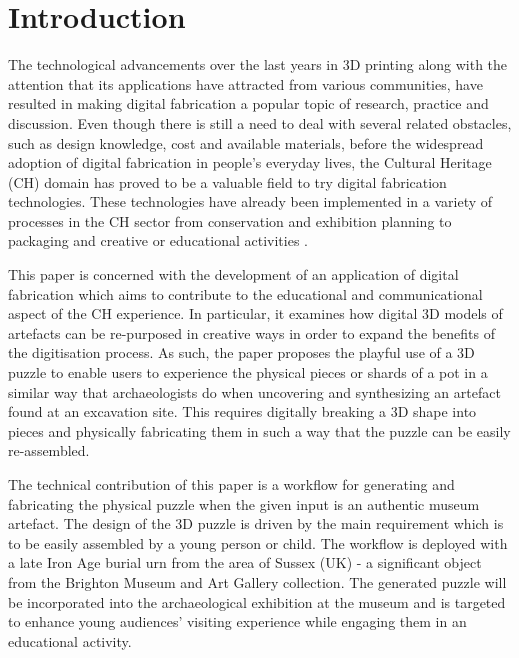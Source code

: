 \documentclass[acmlarge,screen]{acmart}
\begin{document}
\begin{abstract}

\printccsdesc   
\end{abstract}

\section{Introduction}
The technological advancements over the last years in 3D printing along with the attention that its applications have attracted from various communities, have resulted in making digital fabrication a popular topic of research, practice and discussion. Even though there is still a need to deal with several related obstacles, such as design knowledge, cost and  available materials, before the widespread adoption of digital fabrication in people's everyday lives, the Cultural Heritage (CH) domain has proved to be a valuable field to try digital fabrication technologies. These technologies have already been implemented in a variety of processes in the CH sector from conservation and exhibition planning to packaging and creative or educational activities \cite{Neely2013,Scopigno2014,Neumuller2014,Scopigno2015}.

This paper is concerned with the development of an application of digital fabrication which aims to contribute to the educational and communicational aspect of the CH experience. In particular, it examines how digital 3D models of artefacts can be re-purposed in creative ways in order to expand the benefits of the digitisation process. As such, the paper proposes the playful use of a 3D puzzle to enable users to experience the physical pieces or shards of a pot in a similar way that archaeologists do when uncovering and synthesizing an artefact found at an excavation site. This requires digitally breaking a 3D shape into pieces and physically fabricating them in such a way that the puzzle can be easily re-assembled.

The technical contribution of this paper is a workflow for generating and fabricating the physical puzzle when the given input is an authentic museum artefact. The design of the 3D puzzle is driven by the main requirement which is to be easily assembled by a young person or child. The workflow is deployed with a late Iron Age burial urn from the area of Sussex (UK) - a significant object from the Brighton Museum and Art Gallery collection. The generated puzzle will be incorporated into the archaeological exhibition at the museum and is targeted to enhance young audiences' visiting experience while engaging them in an educational activity.
\end{document}
